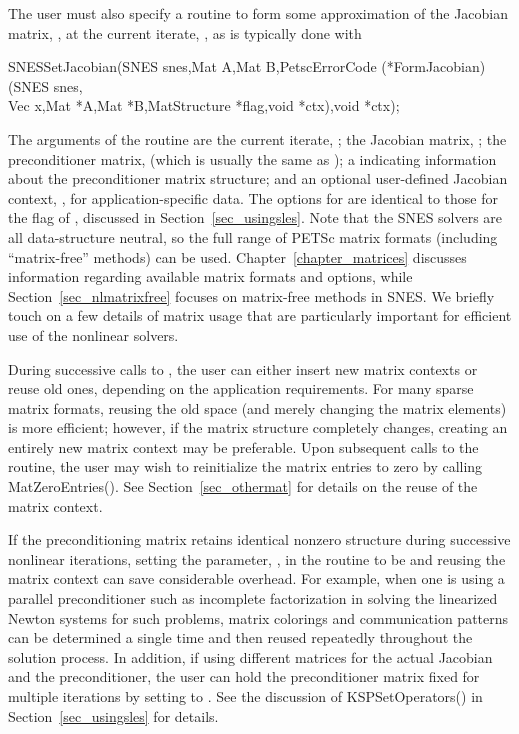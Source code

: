 The user must also specify a routine to form some approximation of the
Jacobian matrix, , at the current iterate, ,
as is typically done with
\begin{tabbing}
  SNESSetJacobian(SNES snes,Mat A,Mat B,PetscErrorCode (*FormJacobian)(SNES snes,\\
          Vec x,Mat *A,Mat *B,MatStructure *flag,void *ctx),void *ctx);
\end{tabbing}
The  arguments of the routine  are the current iterate, ; the Jacobian matrix,
; the preconditioner matrix,  (which is usually the same
as ); a  indicating information about the
preconditioner matrix structure; and an optional user-defined Jacobian
context, , for application-specific data.  The options for
 are identical to those for the flag of , discussed in Section~\ref{sec_usingsles}.  
Note that the SNES solvers are all data-structure neutral, so the full
range of PETSc matrix formats (including ``matrix-free''
methods) can be used.  Chapter~\ref{chapter_matrices} discusses
information regarding available matrix formats and options, while
Section~\ref{sec_nlmatrixfree} focuses on matrix-free
methods in SNES. We briefly touch on a few details of matrix usage that are
particularly important for efficient use of the nonlinear solvers.

During successive calls to , the user can either
insert new matrix contexts or reuse old ones, depending on the
application requirements. For many sparse matrix formats, reusing the
old space (and merely changing the matrix elements) is more efficient;
however, if the matrix structure completely changes, creating an
entirely new matrix context may be preferable.  
Upon subsequent calls to the 
 routine, the user may wish to reinitialize the matrix
entries to zero by calling MatZeroEntries().  See
Section~\ref{sec_othermat} for details on the reuse of the matrix
context.

If the preconditioning matrix retains identical nonzero structure
during successive nonlinear iterations, setting the parameter, ,
in the  routine to be  
 and reusing the matrix context can save
considerable overhead.  For example, when one is using a parallel
preconditioner such as incomplete factorization in solving the
linearized Newton systems for such problems, matrix colorings and
communication patterns can be determined a single time and then reused
repeatedly throughout the solution process.  In addition, if using
different matrices for the actual Jacobian and the preconditioner, the
user can hold the preconditioner matrix fixed for multiple iterations
by setting  to .  See the
discussion of KSPSetOperators() in Section~\ref{sec_usingsles} for
details.


